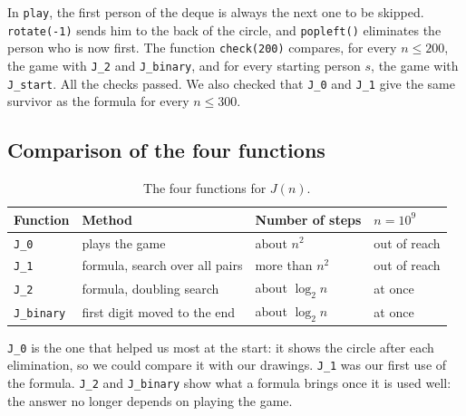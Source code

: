 In \texttt{play}, the first person of the deque is always the next one to be
skipped. \texttt{rotate(-1)} sends him to the back of the circle, and
\texttt{popleft()} eliminates the person who is now first. The function
\texttt{check(200)} compares, for every $n\leq200$, the game with
\texttt{J\_2} and \texttt{J\_binary}, and for every starting person $s$, the
game with \texttt{J\_start}. All the checks passed. We also checked that
\texttt{J\_0} and \texttt{J\_1} give the same survivor as the formula for
every $n\leq300$.

\subsection{Comparison of the four functions}

\begin{table}[!ht]
\centering
\renewcommand{\arraystretch}{1.2}
\begin{tabular}{|l|l|l|l|}
\hline
Function & Method & Number of steps & $n=10^9$\\ \hline
\texttt{J\_0} & plays the game & about $n^2$ & out of reach\\
\texttt{J\_1} & formula, search over all pairs & more than $n^2$ & out of reach\\
\texttt{J\_2} & formula, doubling search & about $\log_2 n$ & at once\\
\texttt{J\_binary} & first digit moved to the end & about $\log_2 n$ & at once\\ \hline
\end{tabular}
\caption{The four functions for $J(n)$.}
\label{tab:code}
\end{table}

\texttt{J\_0} is the one that helped us most at the start: it shows the
circle after each elimination, so we could compare it with our drawings.
\texttt{J\_1} was our first use of the formula. \texttt{J\_2} and
\texttt{J\_binary} show what a formula brings once it is used well: the answer
no longer depends on playing the game.
